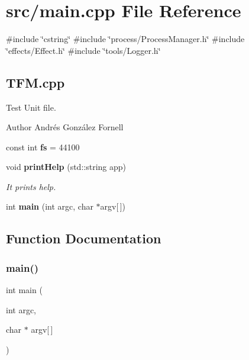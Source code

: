 \section{src/main.cpp File Reference}
\label{main_8cpp}
{\ttfamily \#include \char`\"{}cstring\char`\"{}}\newline
{\ttfamily \#include \char`\"{}process/\+Process\+Manager.\+h\char`\"{}}\newline
{\ttfamily \#include \char`\"{}effects/\+Effect.\+h\char`\"{}}\newline
{\ttfamily \#include \char`\"{}tools/\+Logger.\+h\char`\"{}}\newline
\subsection*{T\+F\+M.\+cpp}
\label{_amgrpa773ab7d34ba8e7d3e77644cbef879e3}%
Test Unit file.

\begin{DoxyAuthor}{Author}
Andrés González Fornell 
\end{DoxyAuthor}
\begin{DoxyCompactItemize}
\item 
const int \textbf{ fs} = 44100
\item 
void \textbf{ print\+Help} (std\+::string app)
\begin{DoxyCompactList}\small\item\em It prints help. \end{DoxyCompactList}\item 
int \textbf{ main} (int argc, char $\ast$argv[$\,$])
\end{DoxyCompactItemize}


\subsection{Function Documentation}
\mbox{\label{main_8cpp_a0ddf1224851353fc92bfbff6f499fa97}} 
\subsubsection{main()}
{\footnotesize\ttfamily int main (\begin{DoxyParamCaption}\item[{int}]{argc,  }\item[{char $\ast$}]{argv[$\,$] }\end{DoxyParamCaption})}

